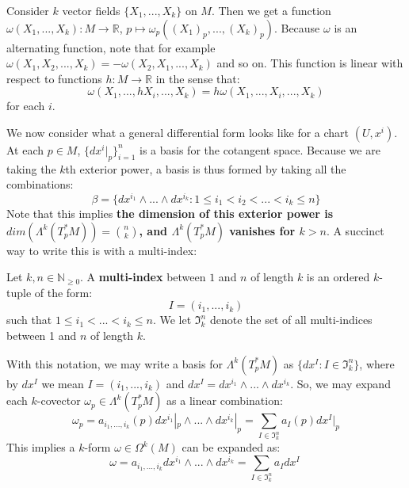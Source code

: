Consider $k$ vector fields $\{X_1, ..., X_k\}$ on $M$. Then we 
get a function $\omega(X_1, ..., X_k) : M\rightarrow\mathbb R$, $p\mapsto \omega_p((X_1)_p, ..., (X_k)_p)$. Because 
$\omega$ is an alternating function, note that for example $\omega(X_1, X_2, ..., X_k) = -\omega(X_2, X_1, ..., X_k)$ and 
so on. This function is linear with respect to functions $h : M\rightarrow\mathbb R$ in the sense that:
\begin{equation}
	\omega(X_1, ..., hX_i, ..., X_k) = h\omega(X_1, ..., X_i, ..., X_k)
\end{equation}
for each $i$. 

We now consider what a general differential form looks like for a chart $(U, x^i)$. At each $p\in M$, $\{dx^i|_p\}_{i = 1}^n$ is a 
basis for the cotangent space. Because we are taking the $k$th exterior power, a basis is thus formed by taking all the 
combinations:
\begin{equation}
	\beta = \{dx^{i_1}\wedge ...\wedge dx^{i_k} : 1\leq i_1 < i_2 < ... < i_k \leq n\}
\end{equation}
Note that this implies \textbf{the dimension of this exterior power is $dim(\Lambda^k(T_p^* M)) = {n\choose k}$, and 
$\Lambda^k(T_p^* M)$ vanishes for $k > n$}. A succinct way to write this is with a multi-index:
\begin{definition}
	Let $k, n\in\mathbb N_{\geq 0}$. A \textbf{multi-index} between $1$ and $n$ of length $k$ is an ordered $k$-tuple 
	of the form:
	\begin{equation}
		I = (i_1, ..., i_k)
	\end{equation}
	such that $1\leq i_1< ...< i_k\leq n$. We let $\mathfrak I_k^n$ denote the set of all multi-indices between 1 and $n$ of 
	length $k$. 
\end{definition}
With this notation, we may write a basis for $\Lambda^k(T_p^*M)$ as $\{dx^I : I\in\mathfrak I_k^n\}$, where by $dx^I$ we 
mean $I = (i_1, ..., i_k)$ and $dx^I = dx^{i_1}\wedge ...\wedge dx^{i_k}$. So, we may expand each $k$-covector $\omega_p
\in\Lambda^k(T_p^* M)$ as a linear combination:
\begin{equation}
	\omega_p = a_{i_1, ..., i_k}(p)dx^{i_1}|_p\wedge ...\wedge dx^{i_k}|_p = \sum_{I\in\mathfrak I_k^n} a_I(p) dx^I|_p
\end{equation}
This implies a $k$-form $\omega\in\Omega^k(M)$ can be expanded as:
\begin{equation}
	\omega = a_{i_1, ..., i_k}dx^{i_1}\wedge ...\wedge dx^{i_k} = \sum_{I\in\mathfrak I_k^n} a_I dx^I~
	\label{eq:k_form}
\end{equation}
